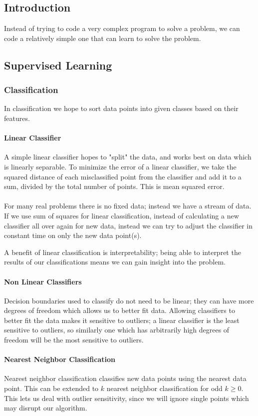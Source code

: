 \documentclass{chezarticle}
\begin{document}
\subsection{Introduction}
Instead of trying to code a very complex program to solve a problem, we can code a relatively simple one that can learn to solve the problem.
\subsection{Supervised Learning}
\subsubsection{Classification}
In classification we hope to sort data points into given classes based on their features.
\paragraph{Linear Classifier}
A simple linear classifier hopes to "split" the data, and works best on data which is linearly separable. To minimize the error of a linear classifier, we take the squared distance of each misclassified point from the classifier and add it to a sum, divided by the total number of points. This is mean squared error.\\
\\
For many real problems there is no fixed data; instead we have a stream of data. If we use sum of squares for linear classification, instead of calculating a new classifier all over again for new data, instead we can try to adjust the classifier in constant time on only the new data point(s). 
\begin{note}
A benefit of linear classification is interpretability; being able to interpret the results of our classifications means we can gain insight into the problem.
\end{note}

\paragraph{Non Linear Classifiers}
Decision boundaries used to classify do not need to be linear; they can have more degrees of freedom which allows us to better fit data. Allowing classifiers to better fit the data makes it sensitive to outliers; a linear classifier is the least sensitive to outliers, so similarly one which has arbitrarily high degrees of freedom will be the most sensitive to outliers. 
\paragraph{Nearest Neighbor Classification}
Nearest neighbor classification classifies new data points using the nearest data point. This can be extended to $k$ nearest neighbor classification for odd $k \geq 0$. This lets us deal with outlier sensitivity, since we will ignore single points which may disrupt our algorithm.
\end{document}
